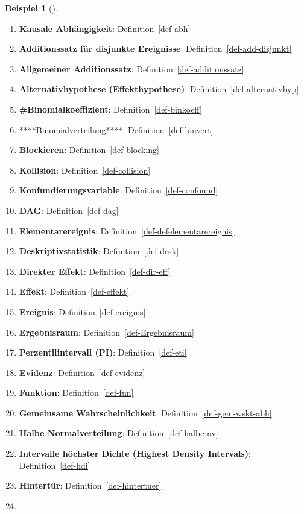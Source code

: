 \documentclass[
  ngerman,
  letterpaper,
  twoside,
  open=any]{scrbook}
\theoremstyle{definition}
\newtheorem{example}{Beispiel}[chapter]
\theoremstyle{plain}
\theoremstyle{definition}
\theoremstyle{definition}
\theoremstyle{remark}
\begin{document}
\begin{example}[]
\begin{enumerate}
\def\labelenumi{\arabic{enumi}.}
\item
  \textbf{Kausale Abhängigkeit}: Definition~\ref{def-abh}
\item
  \textbf{Additionssatz für disjunkte Ereignisse}:
  Definition~\ref{def-add-disjunkt}
\item
  \textbf{Allgemeiner Additionssatz}: Definition~\ref{def-additionssatz}
\item
  \textbf{Alternativhypothese (Effekthypothese)}:
  Definition~\ref{def-alternativhyp}
\item
  \textbf{\#Binomialkoeffizient}: Definition~\ref{def-binkoeff}
\item
  ****Binomialverteilung****: Definition~\ref{def-binvert}
\item
  \textbf{Blockieren}: Definition~\ref{def-blocking}
\item
  \textbf{Kollision}: Definition~\ref{def-collision}
\item
  \textbf{Konfundierungsvariable}: Definition~\ref{def-confound}
\item
  \textbf{DAG}: Definition~\ref{def-dag}
\item
  \textbf{Elementarereignis}: Definition~\ref{def-defelementarereignis}
\item
  \textbf{Deskriptivstatistik}: Definition~\ref{def-desk}
\item
  \textbf{Direkter Effekt}: Definition~\ref{def-dir-eff}
\item
  \textbf{Effekt}: Definition~\ref{def-effekt}
\item
  \textbf{Ereignis}: Definition~\ref{def-ereignis}
\item
  \textbf{Ergebnisraum}: Definition~\ref{def-Ergebnisraum}
\item
  \textbf{Perzentilintervall (PI)}: Definition~\ref{def-eti}
\item
  \textbf{Evidenz}: Definition~\ref{def-evidenz}
\item
  \textbf{Funktion}: Definition~\ref{def-fun}
\item
  \textbf{Gemeinsame Wahrscheinlichkeit}:
  Definition~\ref{def-gem-wskt-abh}
\item
  \textbf{Halbe Normalverteilung}: Definition~\ref{def-halbe-nv}
\item
  \textbf{Intervalle höchster Dichte (Highest Density Intervals)}:
  Definition~\ref{def-hdi}
\item
  \textbf{Hintertür}: Definition~\ref{def-hintertuer}
\item

\end{enumerate}
\end{example}
\end{document}
